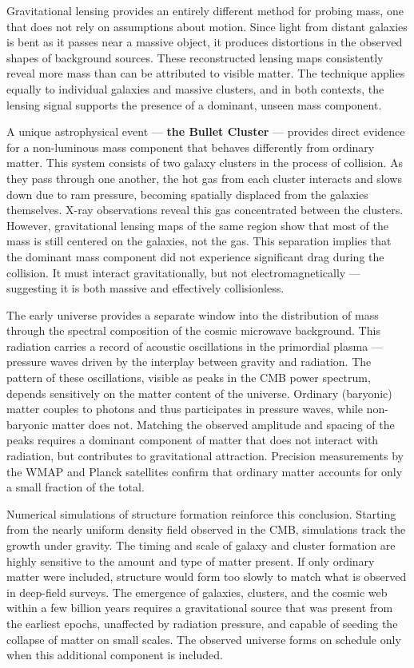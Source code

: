 Gravitational lensing provides an entirely different method for probing mass, one that does not rely on assumptions about motion. Since light from distant galaxies is bent as it passes near a massive object, it produces distortions in the observed shapes of background sources. These reconstructed lensing maps consistently reveal more mass than can be attributed to visible matter. The technique applies equally to individual galaxies and massive clusters, and in both contexts, the lensing signal supports the presence of a dominant, unseen mass component.

A unique astrophysical event — \textbf{the Bullet Cluster} — provides direct evidence for a non-luminous mass component that behaves differently from ordinary matter. This system consists of two galaxy clusters in the process of collision. As they pass through one another, the hot gas from each cluster interacts and slows down due to ram pressure, becoming spatially displaced from the galaxies themselves. X-ray observations reveal this gas concentrated between the clusters. However, gravitational lensing maps of the same region show that most of the mass is still centered on the galaxies, not the gas. This separation implies that the dominant mass component did not experience significant drag during the collision. It must interact gravitationally, but not electromagnetically — suggesting it is both massive and effectively collisionless.

The early universe provides a separate window into the distribution of mass through the spectral composition of the cosmic microwave background. This radiation carries a record of acoustic oscillations in the primordial plasma — pressure waves driven by the interplay between gravity and radiation. The pattern of these oscillations, visible as peaks in the CMB power spectrum, depends sensitively on the matter content of the universe. Ordinary (baryonic) matter couples to photons and thus participates in pressure waves, while non-baryonic matter does not. Matching the observed amplitude and spacing of the peaks requires a dominant component of matter that does not interact with radiation, but contributes to gravitational attraction. Precision measurements by the WMAP and Planck satellites confirm that ordinary matter accounts for only a small fraction of the total.

Numerical simulations of structure formation reinforce this conclusion. Starting from the nearly uniform density field observed in the CMB, simulations track the growth under gravity. The timing and scale of galaxy and cluster formation are highly sensitive to the amount and type of matter present. If only ordinary matter were included, structure would form too slowly to match what is observed in deep-field surveys. The emergence of galaxies, clusters, and the cosmic web within a few billion years requires a gravitational source that was present from the earliest epochs, unaffected by radiation pressure, and capable of seeding the collapse of matter on small scales. The observed universe forms on schedule only when this additional component is included.

